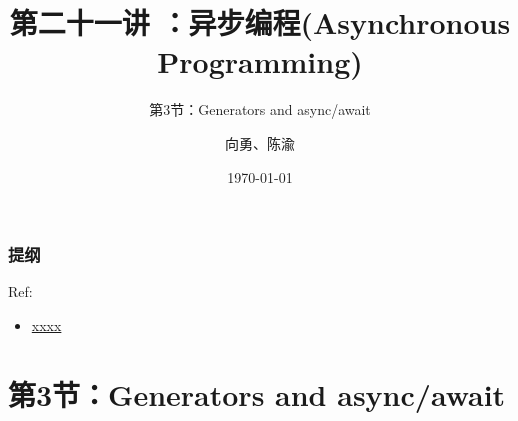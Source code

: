 


\title[第21讲]{第二十一讲 ：异步编程(Asynchronous Programming)} %
\subtitle{第3节：Generators and async/await}
\author{向勇、陈渝} %
\date{\today} %



\begin{frame}
\titlepage %
\end{frame}

\begin{frame}
\frametitle{提纲} %
\tableofcontents %

Ref:
    \begin{itemize}
        \item \href{}{xxxx}
    \end{itemize}

\end{frame}
\section{第3节：Generators and async/await} %
